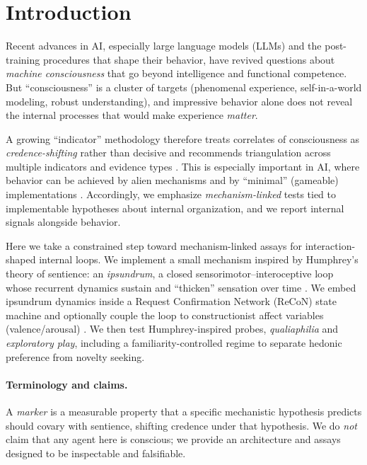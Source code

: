 \documentclass[letterpaper]{article} %
\begin{document}
\section{Introduction}
Recent advances in AI, especially large language models (LLMs) and the post-training procedures that shape their behavior, have revived questions about \emph{machine consciousness} that go beyond intelligence and functional competence.
But ``consciousness'' is a cluster of targets (phenomenal experience, self-in-a-world modeling, robust understanding), and impressive behavior alone does not reveal the internal processes that would make experience \emph{matter}.

A growing ``indicator'' methodology therefore treats correlates of consciousness as \emph{credence-shifting} rather than decisive and recommends triangulation across multiple indicators and evidence types \citep{ButlinEtAl2025Indicators}.
This is especially important in AI, where behavior can be achieved by alien mechanisms and by ``minimal'' (gameable) implementations \citep{ButlinEtAl2025Indicators}.
Accordingly, we emphasize \emph{mechanism-linked} tests tied to implementable hypotheses about internal organization, and we report internal signals alongside behavior.

Here we take a constrained step toward mechanism-linked assays for interaction-shaped internal loops.
We implement a small mechanism inspired by Humphrey's theory of sentience: an \emph{ipsundrum}, a closed sensorimotor--interoceptive loop whose recurrent dynamics sustain and ``thicken'' sensation over time \citep{Humphrey2023Sentience}.
We embed ipsundrum dynamics inside a Request Confirmation Network (ReCoN) state machine \citep{BachHerger2015ReCoN} and optionally couple the loop to constructionist affect variables (valence/arousal) \citep{Barrett2017HowEmotions}.
We then test Humphrey-inspired probes, \emph{qualiaphilia} and \emph{exploratory play}, including a familiarity-controlled regime to separate hedonic preference from novelty seeking.

\paragraph{Terminology and claims.}
A \emph{marker} is a measurable property that a specific mechanistic hypothesis predicts should covary with sentience, shifting credence under that hypothesis.
We do \emph{not} claim that any agent here is conscious; we provide an architecture and assays designed to be inspectable and falsifiable.
\end{document}
